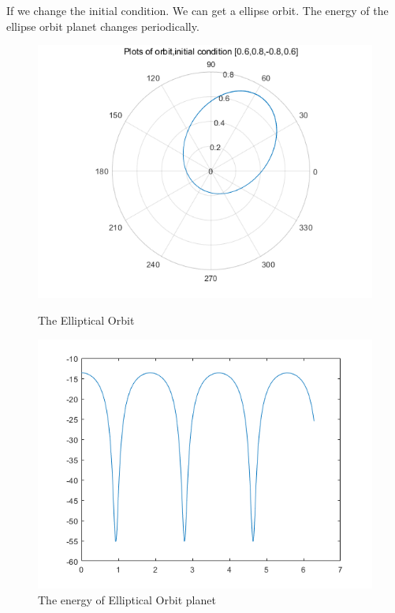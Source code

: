 \documentclass{article}
\begin{document}
If we change the initial condition. We can get a ellipse orbit. The energy of the ellipse orbit planet changes periodically.
\begin{figure}[htbp]
    \centering
    \begin{minipage}{0.45\linewidth}
        \centering
        \includegraphics[width=\linewidth]{ar2.png}
        \caption{The Elliptical Orbit}
    \end{minipage}
    \hfill
    \begin{minipage}{0.45\linewidth}
        \centering
        \includegraphics[width=\linewidth]{ar21.png}
        \caption{The energy of Elliptical Orbit planet}
    \end{minipage}
\end{figure}
\clearpage
\end{document}
